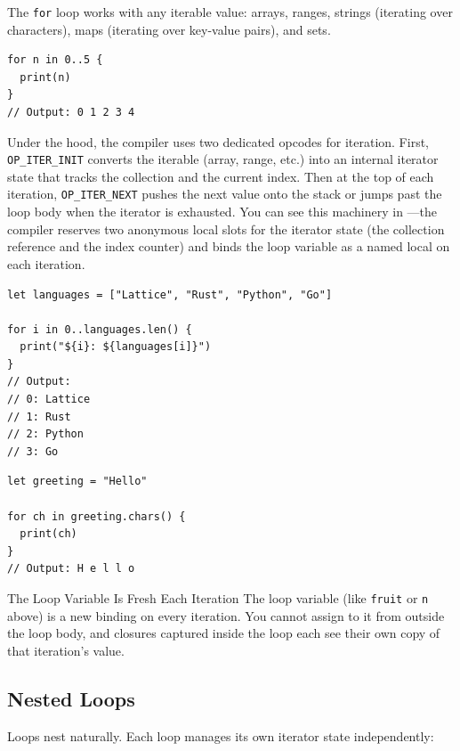 The \lstinline|for| loop works with any iterable value: arrays, ranges, strings (iterating over characters), maps (iterating over key-value pairs), and sets.

\begin{lstlisting}[language=Lattice, caption={Iterating over a range}]
for n in 0..5 {
  print(n)
}
// Output: 0 1 2 3 4
\end{lstlisting}

Under the hood, the compiler uses two dedicated opcodes for iteration. First, \lstinline|OP_ITER_INIT| converts the iterable (array, range, etc.) into an internal iterator state that tracks the collection and the current index. Then at the top of each iteration, \lstinline|OP_ITER_NEXT| pushes the next value onto the stack or jumps past the loop body when the iterator is exhausted. You can see this machinery in ---the compiler reserves two anonymous local slots for the iterator state (the collection reference and the index counter) and binds the loop variable as a named local on each iteration.

\begin{lstlisting}[language=Lattice, caption={Iterating with an index}]
let languages = ["Lattice", "Rust", "Python", "Go"]

for i in 0..languages.len() {
  print("${i}: ${languages[i]}")
}
// Output:
// 0: Lattice
// 1: Rust
// 2: Python
// 3: Go
\end{lstlisting}

\begin{lstlisting}[language=Lattice, caption={Iterating over a string's characters}]
let greeting = "Hello"

for ch in greeting.chars() {
  print(ch)
}
// Output: H e l l o
\end{lstlisting}

\begin{tipbox}{The Loop Variable Is Fresh Each Iteration}
The loop variable (like \lstinline|fruit| or \lstinline|n| above) is a new binding on every iteration. You cannot assign to it from outside the loop body, and closures captured inside the loop each see their own copy of that iteration's value.
\end{tipbox}

\subsection{Nested Loops}\label{sec:nested-loops}

Loops nest naturally. Each loop manages its own iterator state independently:

